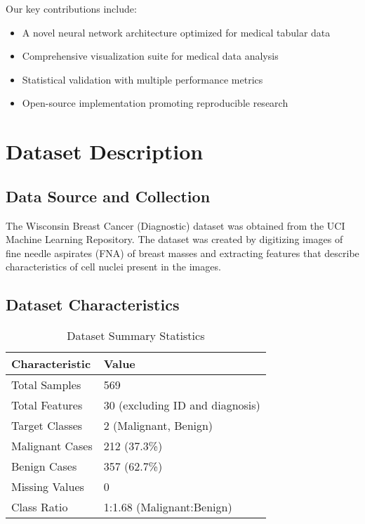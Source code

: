 \documentclass[12pt,a4paper]{article}
\begin{document}
Our key contributions include:
\begin{itemize}
    \item A novel neural network architecture optimized for medical tabular data
    \item Comprehensive visualization suite for medical data analysis
    \item Statistical validation with multiple performance metrics
    \item Open-source implementation promoting reproducible research
\end{itemize}

\section{Dataset Description}

\subsection{Data Source and Collection}

The Wisconsin Breast Cancer (Diagnostic) dataset was obtained from the UCI Machine Learning Repository. The dataset was created by digitizing images of fine needle aspirates (FNA) of breast masses and extracting features that describe characteristics of cell nuclei present in the images.

\subsection{Dataset Characteristics}

\begin{table}[H]
\centering
\caption{Dataset Summary Statistics}
\label{tab:dataset_summary}
\begin{tabular}{@{}ll@{}}
\toprule
\textbf{Characteristic} & \textbf{Value} \\
\midrule
Total Samples & 569 \\
Total Features & 30 (excluding ID and diagnosis) \\
Target Classes & 2 (Malignant, Benign) \\
Malignant Cases & 212 (37.3\%) \\
Benign Cases & 357 (62.7\%) \\
Missing Values & 0 \\
Class Ratio & 1:1.68 (Malignant:Benign) \\
\bottomrule
\end{tabular}
\end{table}
\end{document}
